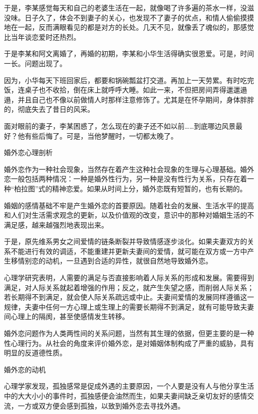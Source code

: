 \documentclass[12pt,UTF8]{ctexbook}
\begin{document}
于是，李某感觉每天和自己的老婆生活在一起，就像喝了许多遍的茶水一样，没滋没味。日子久了，体会不到妻子的关心，也发现不了妻子的优点，和情人偷偷摸摸地在一起，反而满眼看见的都是对方的长处。几天不见，就像丢了魂似的，那感觉比当年谈恋爱时还热烈。

于是李某和阿文离婚了，再婚的初期，李某和小华生活得确实很恩爱。可是，时间一长。问题出现了。

因为，小华每天下班回家后，都要和锅碗瓢盆打交道。再加上一天劳累。有时吃完饭，连桌子也不收拾，倒在床上就呼呼大睡。如此一来，不但把房间弄得邋邋遢遢，并且自己也不像以前做情人时那样注意修饰了。尤其是在怀孕期间，身体胖胖的，彻底失去了昔日的风采。

面对眼前的妻子，李某困惑了，怎么现在的妻子还不如以前……到底哪边风景最好？他有些后悔了。可是，当他梦醒时，一切都太晚了。





婚外恋心理剖析


婚外恋作为一种社会现象，当然存在着产生这种社会现象的生理与心理基础。婚外恋一般包括两种情况：一种是婚外性行为，另一种是没有性行为关系，只存在着一种“柏拉图”式的精神恋爱。如果从时间上分，婚外恋既有短暂的，也有长期的。

婚姻的感情基础不牢是产生婚外恋的首要原因。随着社会的发展、生活水平的提高和人们对生活需求观念的更新，以及价值观的改变，意识中的那种对婚姻生活的不满足感，越来越强烈地表现出来。

于是，原先维系男女之间爱情的链条断裂并导致情感逐步淡化。如果夫妻双方的关系不能进行有效的调适，不能重建并更新夫妻间的爱情，就可能在双方或一方中产生移情别恋的动机，一旦遇到合适的异性，就很自然地导致婚外恋。

心理学研究表明，人需要的满足与否直接影响着人际关系的形成和发展。需要得到满足，对人际关系就起着增强的作用；反之，就产生失望之感，而削弱人际关系；若长期得不到满足，就会使人际关系疏远或中止。夫妻间爱情的发展同样遵循这一规律，夫妻中任何一方心理上或生理上的需要长期得不到满足，就有可能导致夫妻间心理上的隔阂，甚至使感情发生转移。

婚外恋问题作为人类两性间的关系问题，当然有其生理的依据，但更主要的是一种性心理行为。从社会的角度来评价婚外恋，是对婚姻体制构成了严重的威胁，具有明显的反道德性质。





婚外恋的动机


心理学家发现，孤独感常是促成外遇的主要原因，一个人要是没有人与他分享生活中的大大小小的事件时，孤独感便会油然而生，如果夫妻间缺乏亲切友好的感情交流，一方或双方便会感到孤独，以致到婚外恋去寻找外遇。
\end{document}
